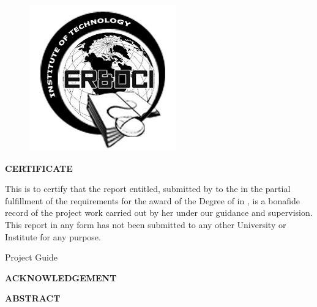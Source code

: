 \documentclass[12pt,a4paper]{report}
\begin{document}

\newpage
\thispagestyle{empty}
\begin{center}
{\insti{}}

\begin{figure}[ht]
\centering
\includegraphics[scale=0.5]{logo}
\end{figure}
{\large{\textbf{CERTIFICATE}}}

\end{center}

This is to certify that the report entitled,\textbf{ \projectname{}} submitted by \textbf{\stud{}} to the \uni{} in the partial fulfillment of the requirements for the award of the Degree of \degree{} in \stream{}, \depts{} is a bonafide record of the project work carried out by her under our guidance and supervision. This report in any form has not been submitted to any other University or Institute for any purpose.
\vspace{25mm}
 \\         
\begin{flushright} Project Guide \end{flushright} 
                                                                                     

\newpage
{}
\begin{center}
\textbf{ACKNOWLEDGEMENT}
\end{center} 

\newpage
\begin{center}
\textbf{ABSTRACT}
\end{center}  

	


\tableofcontents
\listoffigures
\newpage





\newpage



 

\end{document}
